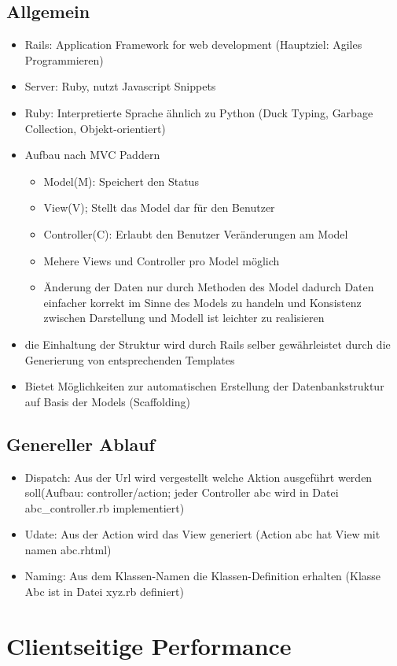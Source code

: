 \documentclass{article} %
\begin{document}
	\subsection{Allgemein}
	\begin{itemize}
		\item Rails: Application Framework for web development (Hauptziel: Agiles Programmieren)
		\item Server: Ruby, nutzt Javascript Snippets
		\item Ruby: Interpretierte Sprache ähnlich zu Python (Duck Typing, Garbage Collection, Objekt-orientiert)
		\item Aufbau nach MVC Paddern
		\begin{itemize}
			\item Model(M): Speichert den Status
			\item View(V); Stellt das Model dar für den Benutzer
			\item Controller(C): Erlaubt den Benutzer Veränderungen am Model
			\item Mehere Views und Controller pro Model möglich
			\item Änderung der Daten nur durch Methoden des Model dadurch Daten einfacher korrekt im Sinne des Models zu handeln und  Konsistenz zwischen Darstellung und Modell ist leichter zu realisieren
		\end{itemize}
		\item die Einhaltung der Struktur wird durch Rails selber gewährleistet durch die Generierung von entsprechenden Templates
		\item Bietet Möglichkeiten zur automatischen Erstellung der Datenbankstruktur auf Basis der Models (Scaffolding)
	\end{itemize}
	\subsection{Genereller Ablauf}
	\begin{itemize}
		\item Dispatch: Aus der Url wird vergestellt welche Aktion ausgeführt werden soll(Aufbau: controller/action; jeder Controller abc wird in Datei abc\_controller.rb implementiert)
		\item Udate: Aus der Action wird das View generiert (Action abc hat View mit namen abc.rhtml)
		\item Naming: Aus dem Klassen-Namen die Klassen-Definition erhalten (Klasse Abc ist in Datei xyz.rb definiert)
	\end{itemize}
\section{Clientseitige Performance}
\end{document}
